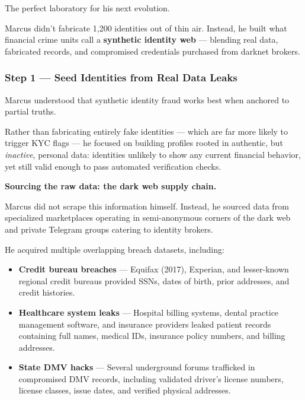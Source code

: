 The perfect laboratory for his next evolution.

Marcus didn’t fabricate 1,200 identities out of thin air.
Instead, he built what financial crime units call a \textbf{synthetic identity web} --- blending real data, fabricated records, and compromised credentials purchased from darknet brokers.

\medskip

\subsubsection*{Step 1 --- Seed Identities from Real Data Leaks}

Marcus understood that synthetic identity fraud works best when anchored to partial truths.

Rather than fabricating entirely fake identities --- which are far more likely to trigger KYC flags --- he focused on building profiles rooted in authentic, but \emph{inactive}, personal data: identities unlikely to show any current financial behavior, yet still valid enough to pass automated verification checks.

\medskip

\textbf{Sourcing the raw data: the dark web supply chain.}

Marcus did not scrape this information himself. Instead, he sourced data from specialized marketplaces operating in semi-anonymous corners of the dark web and private Telegram groups catering to identity brokers. 

He acquired multiple overlapping breach datasets, including:

\begin{itemize}
    \item \textbf{Credit bureau breaches} --- Equifax (2017), Experian, and lesser-known regional credit bureaus provided SSNs, dates of birth, prior addresses, and credit histories.
    
    \item \textbf{Healthcare system leaks} --- Hospital billing systems, dental practice management software, and insurance providers leaked patient records containing full names, medical IDs, insurance policy numbers, and billing addresses.
    
    \item \textbf{State DMV hacks} --- Several underground forums trafficked in compromised DMV records, including validated driver's license numbers, license classes, issue dates, and verified physical addresses.
\end{itemize}

